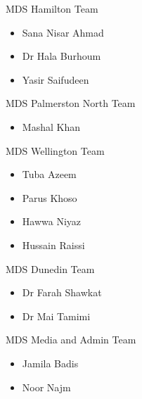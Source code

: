 \documentclass[
  ignorenonframetext,
  aspectratio=169,
]{beamer}
\providecommand{\tightlist}{%
  \setlength{\itemsep}{0pt}\setlength{\parskip}{0pt}}\usepackage{longtable,booktabs,array}
\begin{document}
\begin{frame}{MDS Hamilton Team}
\label{mds-hamilton-team}
\begin{itemize}
\tightlist
\item
  Sana Nisar Ahmad
\item
  Dr Hala Burhoum
\item
  Yasir Saifudeen
\end{itemize}
\end{frame}

\begin{frame}{MDS Palmerston North Team}
\label{mds-palmerston-north-team}
\begin{itemize}
\tightlist
\item
  Mashal Khan
\end{itemize}
\end{frame}

\begin{frame}{MDS Wellington Team}
\label{mds-wellington-team}
\begin{itemize}
\tightlist
\item
  Tuba Azeem
\item
  Parus Khoso
\item
  Hawwa Niyaz
\item
  Hussain Raissi
\end{itemize}
\end{frame}

\begin{frame}{MDS Dunedin Team}
\label{mds-dunedin-team}
\begin{itemize}
\tightlist
\item
  Dr Farah Shawkat
\item
  Dr Mai Tamimi
\end{itemize}
\end{frame}

\begin{frame}{MDS Media and Admin Team}
\label{mds-media-and-admin-team}
\begin{itemize}
\tightlist
\item
  Jamila Badis
\item
  Noor Najm
\end{itemize}
\end{frame}
\end{document}
